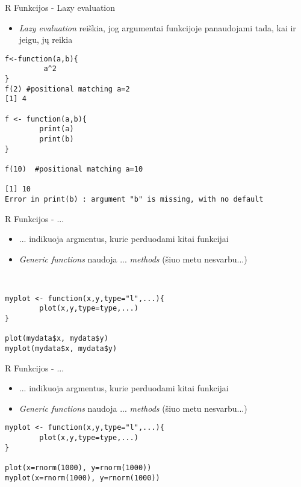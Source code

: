 \documentclass[11pt,xcolor=table]{beamer}
\begin{document}

\begin{frame}[fragile]{R Funkcijos - Lazy evaluation}
\begin{itemize}
\item \textit{Lazy evaluation} reiškia, jog argumentai funkcijoje panaudojami tada, kai ir jeigu, jų reikia
\end{itemize}
\begin{lstlisting}
f<-function(a,b){
         a^2
}
f(2) #positional matching a=2
[1] 4

f <- function(a,b){
        print(a)
        print(b)
}

f(10)  #positional matching a=10

[1] 10
Error in print(b) : argument "b" is missing, with no default
\end{lstlisting}
\end{frame}


\begin{frame}[fragile]{R Funkcijos - ...}
\begin{itemize}
\item ... indikuoja argmentus, kurie perduodami kitai funkcijai
\item \textit{Generic functions} naudoja ... \textit{methods} (šiuo metu nesvarbu...)
\end{itemize}
\begin{lstlisting}


myplot <- function(x,y,type="l",...){
        plot(x,y,type=type,...)
}

plot(mydata$x, mydata$y)
myplot(mydata$x, mydata$y)
\end{lstlisting}
\end{frame}


\begin{frame}[fragile]{R Funkcijos - ...}
\begin{itemize}
\item ... indikuoja argmentus, kurie perduodami kitai funkcijai
\item \textit{Generic functions} naudoja ... \textit{methods} (šiuo metu nesvarbu...)
\end{itemize}
\begin{lstlisting}
myplot <- function(x,y,type="l",...){
        plot(x,y,type=type,...)
}

plot(x=rnorm(1000), y=rnorm(1000))
myplot(x=rnorm(1000), y=rnorm(1000))
\end{lstlisting}
\end{frame}
\end{document}
